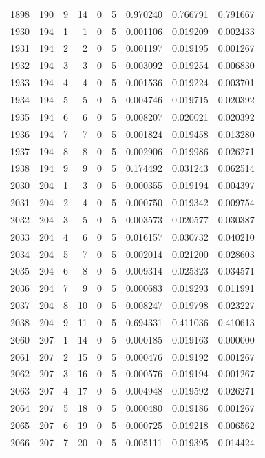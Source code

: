 \begin{longtable}{rrrrrrrrr}
1898 & 190 & 9 & 14 & 0 & 5 & 0.970240 & 0.766791 & 0.791667 \\
1930 & 194 & 1 & 1 & 0 & 5 & 0.001106 & 0.019209 & 0.002433 \\
1931 & 194 & 2 & 2 & 0 & 5 & 0.001197 & 0.019195 & 0.001267 \\
1932 & 194 & 3 & 3 & 0 & 5 & 0.003092 & 0.019254 & 0.006830 \\
1933 & 194 & 4 & 4 & 0 & 5 & 0.001536 & 0.019224 & 0.003701 \\
1934 & 194 & 5 & 5 & 0 & 5 & 0.004746 & 0.019715 & 0.020392 \\
1935 & 194 & 6 & 6 & 0 & 5 & 0.008207 & 0.020021 & 0.020392 \\
1936 & 194 & 7 & 7 & 0 & 5 & 0.001824 & 0.019458 & 0.013280 \\
1937 & 194 & 8 & 8 & 0 & 5 & 0.002906 & 0.019986 & 0.026271 \\
1938 & 194 & 9 & 9 & 0 & 5 & 0.174492 & 0.031243 & 0.062514 \\
2030 & 204 & 1 & 3 & 0 & 5 & 0.000355 & 0.019194 & 0.004397 \\
2031 & 204 & 2 & 4 & 0 & 5 & 0.000750 & 0.019342 & 0.009754 \\
2032 & 204 & 3 & 5 & 0 & 5 & 0.003573 & 0.020577 & 0.030387 \\
2033 & 204 & 4 & 6 & 0 & 5 & 0.016157 & 0.030732 & 0.040210 \\
2034 & 204 & 5 & 7 & 0 & 5 & 0.002014 & 0.021200 & 0.028603 \\
2035 & 204 & 6 & 8 & 0 & 5 & 0.009314 & 0.025323 & 0.034571 \\
2036 & 204 & 7 & 9 & 0 & 5 & 0.000683 & 0.019293 & 0.011991 \\
2037 & 204 & 8 & 10 & 0 & 5 & 0.008247 & 0.019798 & 0.023227 \\
2038 & 204 & 9 & 11 & 0 & 5 & 0.694331 & 0.411036 & 0.410613 \\
2060 & 207 & 1 & 14 & 0 & 5 & 0.000185 & 0.019163 & 0.000000 \\
2061 & 207 & 2 & 15 & 0 & 5 & 0.000476 & 0.019192 & 0.001267 \\
2062 & 207 & 3 & 16 & 0 & 5 & 0.000576 & 0.019194 & 0.001267 \\
2063 & 207 & 4 & 17 & 0 & 5 & 0.004948 & 0.019592 & 0.026271 \\
2064 & 207 & 5 & 18 & 0 & 5 & 0.000480 & 0.019186 & 0.001267 \\
2065 & 207 & 6 & 19 & 0 & 5 & 0.000725 & 0.019218 & 0.006562 \\
2066 & 207 & 7 & 20 & 0 & 5 & 0.005111 & 0.019395 & 0.014424 \\

\end{longtable}
